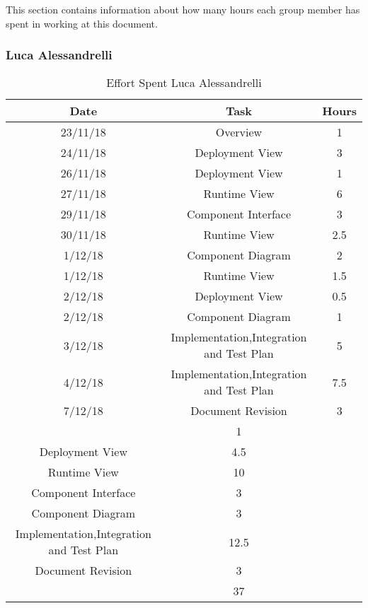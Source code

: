 This section contains information about how many hours each group member has spent in working at this document.
\bigbreak

\subsubsection{Luca Alessandrelli}
\begin{table}[h]
\centering
\begin{tabular}{|c|c|c|}
\hline
\rowcolor[HTML]{FE996B} 
Date & Task & Hours 
\\ \hline
\rowcolor[HTML]{FFFC9E} 
23/11/18  & Overview & 1  
\\ \hline
\rowcolor[HTML]{FFFC9E} 
24/11/18 & Deployment View & 3  
\\ \hline
\rowcolor[HTML]{FFFC9E}
26/11/18 & Deployment View & 1 
\\ \hline
\rowcolor[HTML]{FFFC9E}
27/11/18 & Runtime View & 6 
\\ \hline
\rowcolor[HTML]{FFFC9E}
29/11/18 & Component Interface & 3
\\ \hline
\rowcolor[HTML]{FFFC9E}
30/11/18 & Runtime View & 2.5
\\ \hline
\rowcolor[HTML]{FFFC9E}
1/12/18 & Component Diagram & 2 
\\ \hline
\rowcolor[HTML]{FFFC9E}
1/12/18 & Runtime View & 1.5
\\ \hline
\rowcolor[HTML]{FFFC9E}
2/12/18 & Deployment View & 0.5
\\ \hline
\rowcolor[HTML]{FFFC9E}
2/12/18 & Component Diagram & 1 
\\ \hline
\rowcolor[HTML]{FFFC9E}
3/12/18 & Implementation,Integration and Test Plan & 5
\\ \hline
\rowcolor[HTML]{FFFC9E}
4/12/18 & Implementation,Integration and Test Plan & 7.5
\\ \hline
\rowcolor[HTML]{FFFC9E}
7/12/18 & Document Revision & 3
\\ \hline

\rowcolor[HTML]{FFCE93} 
\multicolumn{2}{|c|}{Overview} & 1 \\ 
\hline
\rowcolor[HTML]{FFCE93} 
\multicolumn{2}{|c|} {Deployment View} & 4.5 \\
\hline
\rowcolor[HTML]{FFCE93} 
\multicolumn{2}{|c|} {Runtime View} & 10 \\
\hline
\rowcolor[HTML]{FFCE93} 
\multicolumn{2}{|c|} {Component Interface} & 3 \\
\hline
\rowcolor[HTML]{FFCE93} 
\multicolumn{2}{|c|} {Component Diagram} & 3 \\
\hline
\rowcolor[HTML]{FFCE93} 
\multicolumn{2}{|c|} {Implementation,Integration and Test Plan} & 12.5 \\
\hline
\rowcolor[HTML]{FFCE93} 
\multicolumn{2}{|c|} {Document Revision} & 3 \\
\hline



\rowcolor[HTML]{FE996B} 
\multicolumn{2}{|c|}{\cellcolor[HTML]{FE996B}Total} & \cellcolor[HTML]{FFFC9E}37 \\ \hline
\end{tabular}
\caption{Effort Spent Luca Alessandrelli}
\end{table}

